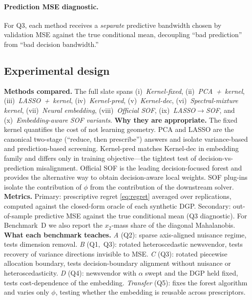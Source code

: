 \documentclass[11pt]{article}
\begin{document}
\paragraph{Prediction MSE diagnostic.}
For Q3, each method receives a \emph{separate} predictive bandwidth chosen by validation MSE against the true conditional mean, decoupling ``bad prediction'' from ``bad decision bandwidth.''

\subsection*{Experimental design}\label{sec:expdesign}

\textbf{Methods compared.} The full slate spans (i)~\emph{Kernel-fixed}, (ii)~\emph{PCA~+~kernel}, (iii)~\emph{LASSO~+~kernel}, (iv)~\emph{Kernel-pred}, (v)~\emph{Kernel-dec}, (vi)~\emph{Spectral-mixture kernel}, (vii)~\emph{Neural embedding}, (viii)~\emph{Official SOF}, (ix)~\emph{LASSO$\to$SOF}, and (x)~\emph{Embedding-aware SOF variants}. \textbf{Why they are appropriate.} The fixed kernel quantifies the cost of not learning geometry. PCA and LASSO are the canonical two-stage (``reduce, then prescribe'') answers and isolate variance-based and prediction-based screening. Kernel-pred matches Kernel-dec in embedding family and differs only in training objective---the tightest test of decision-vs-prediction misalignment. Official SOF is the leading decision-focused forest and provides the alternative way to obtain decision-aware local weights. SOF plug-ins isolate the contribution of $\phi$ from the contribution of the downstream solver. \textbf{Metrics.} Primary: prescriptive regret \eqref{eq:regret} averaged over replications, computed against the closed-form oracle of each synthetic DGP. Secondary: out-of-sample predictive MSE against the true conditional mean (Q3 diagnostic). For Benchmark~D we also report the $x_2$-mass share of the diagonal Mahalanobis. \textbf{What each benchmark teaches.} \emph{A} (Q2): sparse axis-aligned nuisance regime, tests dimension removal. \emph{B} (Q1,~Q3): rotated heteroscedastic newsvendor, tests recovery of variance directions invisible to MSE. \emph{C} (Q3): rotated piecewise allocation boundary, tests decision-boundary alignment without nuisance or heteroscedasticity. \emph{D} (Q4): newsvendor with $\alpha$ swept and the DGP held fixed, tests cost-dependence of the embedding. \emph{Transfer} (Q5): fixes the forest algorithm and varies only $\phi$, testing whether the embedding is reusable across prescriptors.
\end{document}
